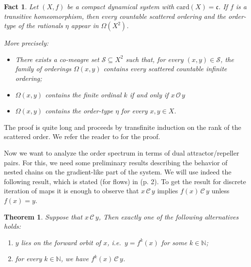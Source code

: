 \documentclass[10pt,a4paper]{article}
\theoremstyle{definition}
\theoremstyle{remark}
\theoremstyle{plain}
\newtheorem*{fact}{Fact}
\newtheorem{thm}[defi]{Theorem}
\begin{document}
\begin{fact}\label{long_t}
    Let $(X,f)$ be a compact dynamical system with $\text{card}(X)=\mathfrak{c}$. If $f$ is a transitive homeomorphism, then every countable  scattered ordering and the order-type of the rationals $\eta$ appear in $\Omega(X^2)$.
    
\vspace{0.3cm}

    More precisely:
    \begin{itemize}
        \item[1.]There exists a co-meagre set $\mathcal{S}\subseteq X^2$ such that, for every $(x,y)\in \mathcal{S}$, the family of orderings $\Omega(x,y)$ contains every scattered countable infinite ordering;
        \item[2.] $\Omega(x,y)$ contains the finite ordinal $k$ if and only if $x\,\mathcal{O}\,y$
        \item[3.]$\Omega(x,y)$ contains the order-type $\eta$ for every $x,y\in X$.
    \end{itemize}
\end{fact}
 The proof is quite long and proceeds by transfinite induction on the rank of the scattered order. We refer the reader to \cite{CFL} for the proof.
 

\bigskip

Now we want to analyze the order spectrum in terms of dual attractor/repeller pairs. For this, we need some preliminary results describing the behavior of nested chains on the gradient-like part of the system. We will use indeed the following result, which is stated (for flows) in \cite{Jacobs} (p. 2). To get the result for discrete iteration of maps it is enough to observe that $x\,\mathcal{C}\,y$ implies $f(x)\,\mathcal{C}\,y$ unless $f(x)=y$.
\begin{thm}\label{prop:Jacobs}
    Suppose that $x\,\mathcal{C}\,y$, Then exactly one of the 
    following alternatives holds:
    \begin{enumerate}
        \item[(1)] $y$ lies on the forward orbit of $x$, i.e.\ 
        $y=f^k(x)$ for some $k\in\mathbb{N}$;
        \item[(2)] for every $k\in\mathbb{N}$, we have 
        $f^k(x)\,\mathcal{C}\,y$.
    \end{enumerate}
\end{thm}
\end{document}
